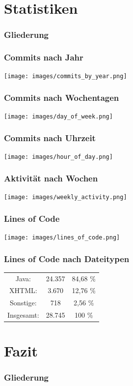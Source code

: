 \documentclass{beamer}
\begin{document}
\section{Statistiken}

\begin{frame}
\frametitle{Gliederung}
\tableofcontents[currentsection]
\end{frame}

\begin{frame}
\frametitle{Commits nach Jahr}
\texttt{[image: images/commits\_by\_year.png]}
\end{frame}

\begin{frame}
\frametitle{Commits nach Wochentagen}
\texttt{[image: images/day\_of\_week.png]}
\end{frame}

\begin{frame}
\frametitle{Commits nach Uhrzeit}
\texttt{[image: images/hour\_of\_day.png]}
\end{frame}

\begin{frame}
\frametitle{Aktivität nach Wochen}
\texttt{[image: images/weekly\_activity.png]}
\end{frame}

\begin{frame} 
  \frametitle{Lines of Code}
  \texttt{[image: images/lines\_of\_code.png]}
\end{frame}

\begin{frame}
\frametitle{Lines of Code nach Dateitypen}
\renewcommand{\arraystretch}{2}
\begin{table}
\centering
\begin{tabular}{ccc}
Java: & 24.357 & 84,68 \%\\
XHTML: & 3.670  & 12,76 \%\\
Sonstige: & 718  & 2,56 \%\\
\hline\hline
Insgesamt: & 28.745 & 100 \%\\
\end{tabular}
\end{table}
\end{frame}

\section{Fazit}
\begin{frame}
\frametitle{Gliederung}
\tableofcontents[currentsection]
\end{frame}
\end{document}
